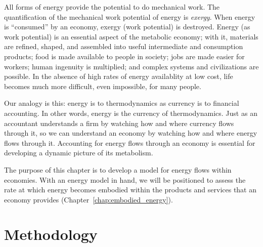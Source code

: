 All forms of energy provide the potential to do mechanical work. The 
quantification of the mechanical work potential of energy is \emph{exergy}.
When energy is ``consumed'' by an economy, exergy (work potential) is destroyed. 
Energy (as work potential) 
is an essential aspect of the metabolic economy;
with it, materials are refined, shaped, and assembled
into useful intermediate and consumption products; 
food is made available to people in society; 
jobs are made easier for workers;
human ingenuity is multiplied;
and complex systems and civilizations are possible.
In the absence of high rates of energy availablity at low cost,
life becomes much more difficult, even impossible, for many people.

Our analogy is this: 
energy is to thermodynamics as currency is to financial accounting.
In other words, energy is the currency of thermodynamics.
Just as an accountant understands a firm by watching how and where
currency flows through it, so we can understand an economy by watching
how and where energy flows through it.
Accounting for energy flows through an economy
is essential for developing a dynamic picture 
of its metabolism.

The purpose of this chapter is to develop 
a model for energy flows within economies.
With an energy model in hand, we will be positioned 
to assess the rate at which
energy becomes embodied within the products and 
services that an economy provides
(Chapter~\ref{chap:embodied_energy}).


\section{Methodology}
\label{sec:energy_methodology}

